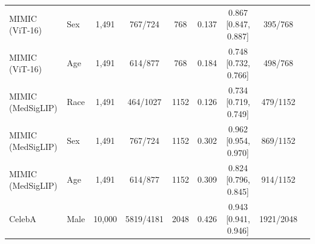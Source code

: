 \begin{table}[ht]
\begin{tabular}{llccccccc}
MIMIC (ViT-16) & Sex & 1,491 & 767/724 & 768 & 0.137 & 0.867 [0.847, 0.887] & 395/768 \\
MIMIC (ViT-16) & Age & 1,491 & 614/877 & 768 & 0.184 & 0.748 [0.732, 0.766] & 498/768 \\
MIMIC (MedSigLIP) & Race & 1,491 & 464/1027 & 1152 & 0.126 & 0.734 [0.719, 0.749] & 479/1152 \\
MIMIC (MedSigLIP) & Sex & 1,491 & 767/724 & 1152 & 0.302 & 0.962 [0.954, 0.970] & 869/1152 \\
MIMIC (MedSigLIP) & Age & 1,491 & 614/877 & 1152 & 0.309 & 0.824 [0.796, 0.845] & 914/1152 \\
CelebA & Male & 10,000 & 5819/4181 & 2048 & 0.426 & 0.943 [0.941, 0.946] & 1921/2048 \\
\hline
\end{tabular}
\end{table}